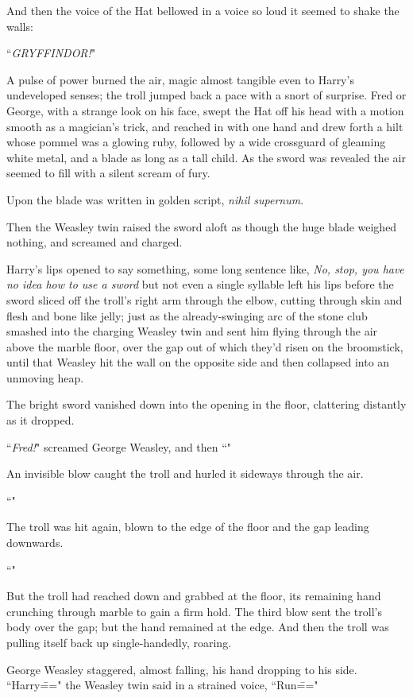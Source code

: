 And then the voice of the Hat bellowed in a voice so loud it seemed to shake the walls:

``\emph{GRYFFINDOR!}"

A pulse of power burned the air, magic almost tangible even to Harry's undeveloped senses; the troll jumped back a pace with a snort of surprise. Fred or George, with a strange look on his face, swept the Hat off his head with a motion smooth as a magician's trick, and reached in with one hand and drew forth a hilt whose pommel was a glowing ruby, followed by a wide crossguard of gleaming white metal, and a blade as long as a tall child. As the sword was revealed the air seemed to fill with a silent scream of fury.

Upon the blade was written in golden script, \emph{nihil supernum}.

Then the Weasley twin raised the sword aloft as though the huge blade weighed nothing, and screamed and charged.

Harry's lips opened to say something, some long sentence like, \emph{No, stop, you have no idea how to use a sword} but not even a single syllable left his lips before the sword sliced off the troll's right arm through the elbow, cutting through skin and flesh and bone like jelly; just as the already-swinging arc of the stone club smashed into the charging Weasley twin and sent him flying through the air above the marble floor, over the gap out of which they'd risen on the broomstick, until that Weasley hit the wall on the opposite side and then collapsed into an unmoving heap.

The bright sword vanished down into the opening in the floor, clattering distantly as it dropped.

``\emph{Fred!}" screamed George Weasley, and then ``"

An invisible blow caught the troll and hurled it sideways through the air.

``"

The troll was hit again, blown to the edge of the floor and the gap leading downwards.

``"

But the troll had reached down and grabbed at the floor, its remaining hand crunching through marble to gain a firm hold. The third blow sent the troll's body over the gap; but the hand remained at the edge. And then the troll was pulling itself back up single-handedly, roaring.

George Weasley staggered, almost falling, his hand dropping to his side. ``Harry\===" the Weasley twin said in a strained voice, ``Run\==="

